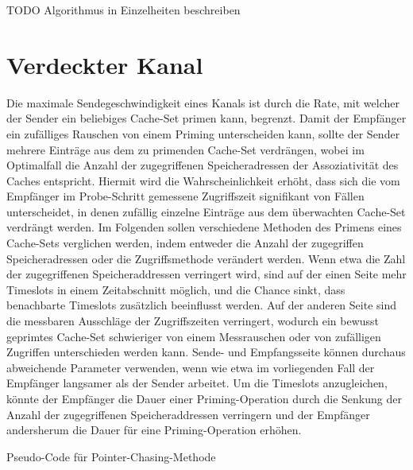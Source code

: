 TODO Algorithmus in Einzelheiten beschreiben


\section{Verdeckter Kanal}

Die maximale Sendegeschwindigkeit eines Kanals ist durch die Rate, mit welcher der Sender ein beliebiges Cache-Set primen kann, begrenzt.
Damit der Empfänger ein zufälliges Rauschen von einem Priming unterscheiden kann, sollte der Sender mehrere Einträge aus dem zu primenden Cache-Set verdrängen, wobei im Optimalfall die Anzahl der zugegriffenen Speicheradressen der Assoziativität des Caches entspricht.
Hiermit wird die Wahrscheinlichkeit erhöht, dass sich die vom Empfänger im Probe-Schritt gemessene Zugriffszeit signifikant von Fällen unterscheidet, in denen zufällig einzelne Einträge aus dem überwachten Cache-Set verdrängt werden. 
Im Folgenden sollen verschiedene Methoden des Primens eines Cache-Sets verglichen werden, indem entweder die Anzahl der zugegriffen Speicheradressen oder die Zugriffsmethode verändert werden.
Wenn etwa die Zahl der zugegriffenen Speicheraddressen verringert wird, sind auf der einen Seite mehr Timeslots in einem Zeitabschnitt möglich, und die Chance sinkt, dass benachbarte Timeslots zusätzlich beeinflusst werden. Auf der anderen Seite sind die messbaren Ausschläge der Zugriffszeiten verringert, wodurch ein bewusst geprimtes Cache-Set schwieriger von einem Messrauschen oder von zufälligen Zugriffen unterschieden werden kann.
Sende- und Empfangsseite können durchaus abweichende Parameter verwenden, wenn wie etwa im vorliegenden Fall der Empfänger langsamer als der Sender arbeitet. Um die Timeslots anzugleichen, könnte der Empfänger die Dauer einer Priming-Operation durch die Senkung der Anzahl der zugegriffenen Speicheraddressen verringern und der Empfänger andersherum die Dauer für eine Priming-Operation erhöhen. 

\begin{algorithm}[h]
\DontPrintSemicolon
\caption{Pseudo-Code für Pointer-Chasing-Methode}
\label{alg:pointerChasing}


\end{algorithm}

